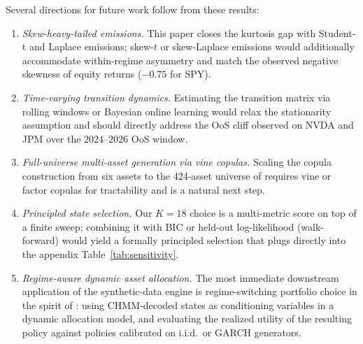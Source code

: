 Several directions for future work follow from these results:
\begin{enumerate}
    \item \textit{Skew-heavy-tailed emissions.}
    This paper closes the kurtosis gap with Student-t and Laplace emissions; skew-$t$ or skew-Laplace emissions would additionally accommodate within-regime asymmetry and match the observed negative skewness of equity returns ($-0.75$ for SPY).

    \item \textit{Time-varying transition dynamics.}
    Estimating the transition matrix via rolling windows or Bayesian online learning would relax the stationarity assumption and should directly address the OoS cliff observed on NVDA and JPM over the $2024$--$2026$ OoS window.

    \item \textit{Full-universe multi-asset generation via vine copulas.}
    Scaling the copula construction from six assets to the 424-asset universe of \citet{alswaidan2026hybrid} requires vine or factor copulas for tractability and is a natural next step.

    \item \textit{Principled state selection.}
    Our $K = 18$ choice is a multi-metric score on top of a finite sweep; combining it with BIC or held-out log-likelihood (walk-forward) would yield a formally principled selection that plugs directly into the appendix Table~\ref{tab:sensitivity}.

    \item \textit{Regime-aware dynamic asset allocation.}
    The most immediate downstream application of the synthetic-data engine is regime-switching portfolio choice in the spirit of \citet{baekimmulvey2014}: using CHMM-decoded states as conditioning variables in a dynamic allocation model, and evaluating the realized utility of the resulting policy against policies calibrated on i.i.d.\ or GARCH generators.
\end{enumerate}

